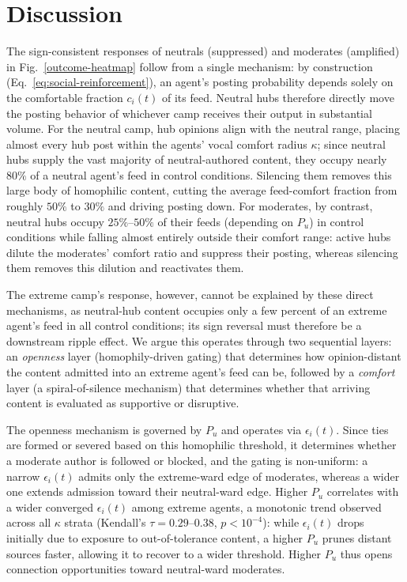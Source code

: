 \documentclass{svproc}
\def\BoundedConfidence{\epsilon} %
\def\VCR{\kappa}                 %
\begin{document}
\section{Discussion}\label{sec:discussion}
The sign-consistent responses of neutrals (suppressed) and moderates
(amplified) in Fig.~\ref{outcome-heatmap} follow from a single
mechanism: by construction (Eq.~\eqref{eq:social-reinforcement}), an
agent's posting probability depends solely on the comfortable fraction
$c_i(t)$ of its feed. Neutral hubs therefore directly move the posting
behavior of whichever camp receives their output in substantial
volume. For the neutral camp, hub opinions align with the neutral
range, placing almost every hub post within the agents' vocal comfort
radius $\VCR$; since neutral hubs supply the vast majority of
neutral-authored content, they occupy nearly $80\%$ of a neutral
agent's feed in control conditions. Silencing them removes this large
body of homophilic content, cutting the average feed-comfort fraction
from roughly $50\%$ to $30\%$ and driving posting down. For moderates,
by contrast, neutral hubs occupy $25\%\text{--}50\%$ of their feeds
(depending on $P_u$) in control conditions while falling almost entirely outside their
comfort range: active hubs dilute the moderates' comfort ratio and
suppress their posting, whereas silencing them removes this dilution and
reactivates them.
\par


The extreme camp's response, however, cannot be explained by these
direct mechanisms, as neutral-hub content occupies only a few percent
of an extreme agent's feed in all control conditions; its sign
reversal must therefore be a downstream ripple effect. We argue this
operates through two sequential layers: an \emph{openness} layer
(homophily-driven gating) that determines how opinion-distant the
content admitted into an extreme agent's feed can be, followed by a
\emph{comfort} layer (a spiral-of-silence mechanism) that determines
whether that arriving content is evaluated as supportive or
disruptive.
\par


The openness mechanism is governed by $P_u$ and operates via
$\BoundedConfidence_i(t)$. Since ties are formed or severed based on
this homophilic threshold, it determines whether a moderate author is
followed or blocked, and the gating is non-uniform: a narrow
$\BoundedConfidence_i(t)$ admits only the extreme-ward edge of
moderates, whereas a wider one extends admission toward their
neutral-ward edge. Higher $P_u$ correlates with a wider converged
$\BoundedConfidence_i(t)$ among extreme agents, a monotonic trend
observed across all $\VCR$ strata (Kendall's $\tau=0.29\text{--}0.38$,
$p<10^{-4}$): while $\BoundedConfidence_i(t)$ drops initially due to
exposure to out-of-tolerance content, a higher $P_u$ prunes distant
sources faster, allowing it to recover to a wider threshold. Higher
$P_u$ thus opens connection opportunities toward neutral-ward
moderates.
\par
\end{document}
